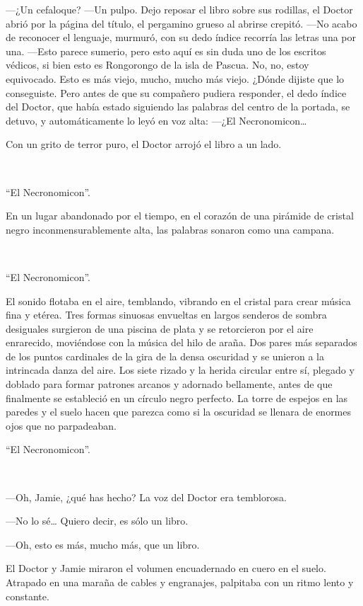 ---¿Un cefaloque? ---Un pulpo. Dejo reposar el libro sobre sus rodillas,
el Doctor abrió por la página del título, el pergamino grueso al abrirse
crepitó. ---No acabo de reconocer el lenguaje, murmuró, con su dedo
índice recorría las letras una por una. ---Esto parece sumerio, pero
esto aquí es sin duda uno de los escritos védicos, si bien esto es
Rongorongo de la isla de Pascua. No, no, estoy equivocado. Esto es más
viejo, mucho, mucho más viejo. ¿Dónde dijiste que lo conseguiste. Pero
antes de que su compañero pudiera responder, el dedo índice del Doctor,
que había estado siguiendo las palabras del centro de la portada, se
detuvo, y automáticamente lo leyó en voz alta: ---¿El
Necronomicon\ldots{}

Con un grito de terror puro, el Doctor arrojó el libro a un lado.

~

``El Necronomicon''.

En un lugar abandonado por el tiempo, en el corazón de una pirámide de
cristal negro inconmensurablemente alta, las palabras sonaron como una
campana.

~

``El Necronomicon''.

El sonido flotaba en el aire, temblando, vibrando en el cristal para
crear música fina y etérea. Tres formas sinuosas envueltas en largos
senderos de sombra desiguales surgieron de una piscina de plata y se
retorcieron por el aire enrarecido, moviéndose con la música del hilo de
araña. Dos pares más separados de los puntos cardinales de la gira de la
densa oscuridad y se unieron a la intrincada danza del aire. Los siete
rizado y la herida circular entre sí, plegado y doblado para formar
patrones arcanos y adornado bellamente, antes de que finalmente se
estableció en un círculo negro perfecto. La torre de espejos en las
paredes y el suelo hacen que parezca como si la oscuridad se llenara de
enormes ojos que no parpadeaban.

``El Necronomicon''.

~

---Oh, Jamie, ¿qué has hecho? La voz del Doctor era temblorosa.

---No lo sé\ldots{} Quiero decir, es sólo un libro.

---Oh, esto es más, mucho más, que un libro.

El Doctor y Jamie miraron el volumen encuadernado en cuero en el suelo.
Atrapado en una maraña de cables y engranajes, palpitaba con un ritmo
lento y constante.

